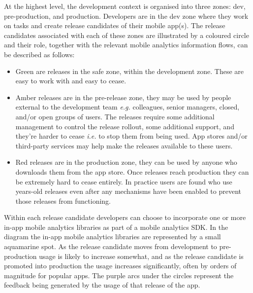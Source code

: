 At the highest level, the development context is organised into three zones: dev, pre-production, and production. Developers are in the dev zone where they work on tasks and create release candidates of their mobile app(s). The release candidates associated with each of these zones are illustrated by a coloured circle and their role, together with the relevant mobile analytics information flows, can be described as follows: 
    \begin{itemize}
    \item Green are releases in the safe zone, within the development zone. These are easy to work with and easy to cease.
    \item Amber releases are in the pre-release zone, they may be used by people external to the development team \textit{e.g.} colleagues, senior managers, closed, and/or open groups of users. The releases require some additional management to control the release rollout, some additional support, and they're harder to cease \textit{i.e.} to stop them from being used. App stores and/or third-party services may help make the releases available to these users.
    \item Red releases are in the production zone, they can be used by anyone who downloads them from the app store. Once releases reach production they can be extremely hard to cease entirely. In practice users are found who use years-old releases even after any mechanisms have been enabled to prevent those releases from functioning. 
    \end{itemize}

Within each release candidate developers can choose to incorporate one or more in-app mobile analytics libraries as part of a mobile analytics SDK. In the diagram the in-app mobile analytics libraries are represented by a small aquamarine spot. As the release candidate moves from development to pre-production usage is likely to increase somewhat, and as the release candidate is promoted into production the usage increases significantly, often by orders of magnitude for popular apps. The purple arcs under the circles represent the feedback being generated by the usage of that release of the app.


